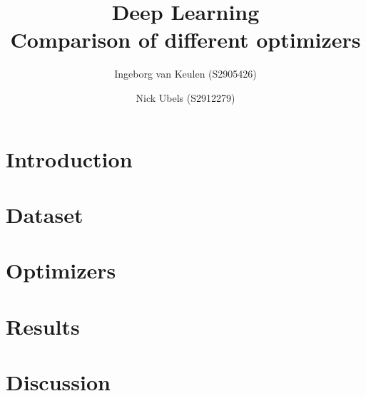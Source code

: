 \documentclass{article}
\title{\textbf{\huge Deep Learning\\ Comparison of different optimizers}}%
\author{Ingeborg van Keulen (S2905426) \and
    Nick Ubels (S2912279)}
\begin{document}
\ttl
\thispagestyle{empty}

\section{Introduction}

\section{Dataset}

\section{Optimizers}

\section{Results}

\section{Discussion}

%
%
%
\end{document}
